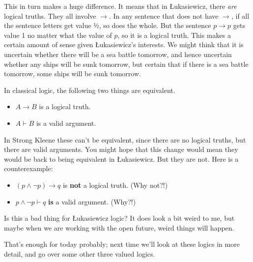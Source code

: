 \documentclass[
]{article}
\providecommand{\tightlist}{%
  \setlength{\itemsep}{0pt}\setlength{\parskip}{0pt}}\usepackage{longtable,booktabs,array}
\begin{document}
This in turn makes a huge difference. It means that in Łukasiewicz,
there \emph{are} logical truths. They all involve \(\rightarrow\). In
any sentence that does not have \(\rightarrow\), if all the sentence
letters get value ½, so does the whole. But the sentence
\(p \rightarrow p\) gets value 1 no matter what the value of \(p\), so
it is a logical truth. This makes a certain amount of sense given
Łukasiewicz's interests. We might think that it is uncertain whether
there will be a sea battle tomorrow, and hence uncertain whether any
ships will be sunk tomorrow, but certain that if there is a sea battle
tomorrow, some ships will be sunk tomorrow.

In classical logic, the following two things are equivalent.

\begin{itemize}
\tightlist
\item
  \(A \rightarrow B\) is a logical truth.
\item
  \(A \vdash B\) is a valid argument.
\end{itemize}

In Strong Kleene these can't be equivalent, since there are no logical
truths, but there are valid arguments. You might hope that this change
would mean they would be back to being equivalent in Łukasiewicz. But
they are not. Here is a counterexample:

\begin{itemize}
\tightlist
\item
  \((p \wedge \neg p) \rightarrow q\) is \textbf{not} a logical truth.
  (Why not?!)
\item
  \(p \wedge \neg p \vdash q\) \textbf{is} a valid argument. (Why?!)
\end{itemize}

Is this a bad thing for Łukasiewicz logic? It does look a bit weird to
me, but maybe when we are working with the open future, weird things
will happen.

That's enough for today probably; next time we'll look at these logics
in more detail, and go over some other three valued logics.
\end{document}
